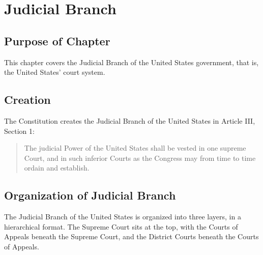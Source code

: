 %
%
%
%
%
%

\chapter{Judicial Branch}

\section{Purpose of Chapter}
This chapter covers the Judicial Branch of the United States government, that is, the United States' court system.

\section{Creation}
The Constitution creates the Judicial Branch of the United States in Article III, Section 1:

\begin{quote}
The judicial Power of the United States shall be vested in one supreme Court, and in such inferior Courts as the Congress may from time to time ordain and establish.
\end{quote}

\section{Organization of Judicial Branch}

The Judicial Branch of the United States is organized into three layers, in a hierarchical format.  The Supreme Court sits at the top, with the Courts of Appeals beneath the Supreme Court, and the District Courts beneath the Courts of Appeals.

